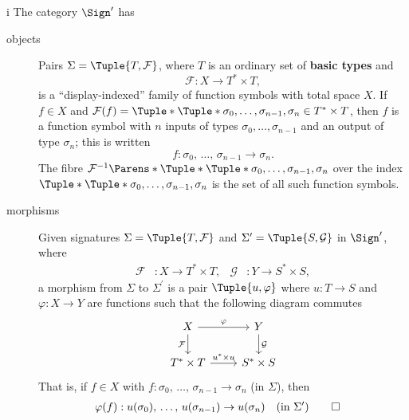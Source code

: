 \begin{partsolution}{i}
The category \(\Sign^\prime\) has
\begin{description}
\item[objects]
Pairs \(\Sigma = \Tuple{T, \mathcal{F}}\), where \(T\) is an ordinary set of \textbf{basic types} and
\begin{equation*}
\mathcal{F} : X \to T^* \times T,
\end{equation*}
is a ``display-indexed'' family of function symbols with total space \(X\).
If \(f \in X\) and \(\mathcal{F}(f) = \Tuple*{\Tuple*{\sigma_0,\ldots,\sigma_{n-1}},\sigma_n} \in T^* \times T\), then \(f\) is a function symbol with \(n\) inputs of types \(\sigma_0, \ldots, \sigma_{n-1}\) and an output of type \(\sigma_n\); this is written
\begin{equation*}
f : \sigma_0,\,\ldots,\,\sigma_{n-1} \to \sigma_n.
\end{equation*}
The fibre \(\mathcal{F}^{-1}\Parens*{\Tuple*{\Tuple*{\sigma_0,\ldots,\sigma_{n-1}},\sigma_n}}\) over the index \(\Tuple*{\Tuple*{\sigma_0,\ldots,\sigma_{n-1}},\sigma_n}\) is the set of all such function symbols.
\item[morphisms]
Given signatures \(\Sigma = \Tuple{T, \mathcal{F}}\) and \(\Sigma^\prime = \Tuple{S, \mathcal{G}}\) in \(\Sign^\prime\), where
\begin{align*}
\mathcal{F} &: X \to T^* \times T, &
\mathcal{G} &: Y \to S^* \times S,
\end{align*}
a morphism from \(\Sigma\) to \(\Sigma^\prime\) is a pair \(\Tuple{u, \varphi}\) where \(u : T \to S\) and \(\varphi : X \to Y\) are functions such that the following diagram commutes
\begin{equation*}
\begin{tikzcd}
X \arrow[r, "\varphi"] \arrow[d, "\mathcal{F}"{left}]
& Y \arrow[d, "\mathcal{G}"{right}] \\
T^* \times T \arrow[r, "u^* \times u"]
& S^* \times S
\end{tikzcd}
\end{equation*}
That is, if \(f \in X\) with \(f : \sigma_0,\,\ldots,\,\sigma_{n-1}\to\sigma_n\) (in \(\Sigma\)), then
\begin{align*}
\varphi(f) &: u(\sigma_0),\, \ldots,\, u(\sigma_{n-1}) \to u(\sigma_n)
&&\text{(in \(\Sigma^\prime\))}
\qedhere
\end{align*}
\end{description}
\end{partsolution}

